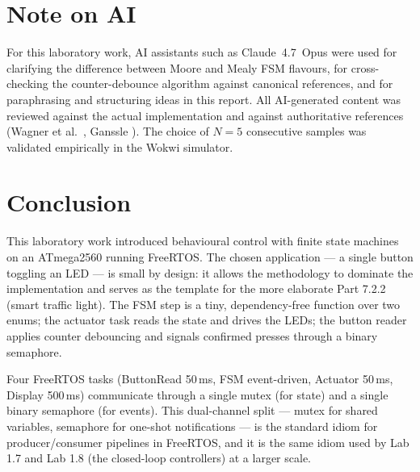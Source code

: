 \documentclass[12pt]{article}
\begin{document}
\section{Note on AI}

\hspace{0.8cm}
For this laboratory work, AI assistants such as Claude~4.7~Opus were used for clarifying the difference between Moore and Mealy FSM flavours, for cross-checking the counter-debounce algorithm against canonical references, and for paraphrasing and structuring ideas in this report. All AI-generated content was reviewed against the actual implementation and against authoritative references (Wagner et al.\ \cite{wagner}, Ganssle \cite{debounce}). The choice of $N = 5$ consecutive samples was validated empirically in the Wokwi simulator.

\section{Conclusion}

\hspace{0.8cm}
This laboratory work introduced behavioural control with finite state machines on an ATmega2560 running FreeRTOS. The chosen application --- a single button toggling an LED --- is small by design: it allows the methodology to dominate the implementation and serves as the template for the more elaborate Part 7.2.2 (smart traffic light). The FSM step is a tiny, dependency-free function over two enums; the actuator task reads the state and drives the LEDs; the button reader applies counter debouncing and signals confirmed presses through a binary semaphore.

\hspace{0.8cm}
Four FreeRTOS tasks (ButtonRead 50\,ms, FSM event-driven, Actuator 50\,ms, Display 500\,ms) communicate through a single mutex (for state) and a single binary semaphore (for events). This dual-channel split --- mutex for shared variables, semaphore for one-shot notifications --- is the standard idiom for producer/consumer pipelines in FreeRTOS, and it is the same idiom used by Lab 1.7 and Lab 1.8 (the closed-loop controllers) at a larger scale.
\end{document}
